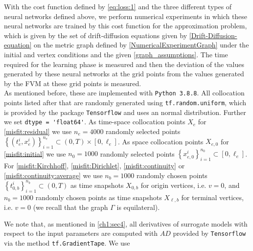 With the cost function defined by \cref{eq:loss:1} and the three different types of neural networks defined above, we perform numerical experiments in which these neural networks are trained by this cost function for the approximation problem, which is given by the set of drift-diffusion equations given by \cref{Drift-Diffusion-equation} on the metric graph defined by \cref{NumericalExperimentGraph} under the initial and vertex conditions and the given \cref{graph_assumptions}. The time required for the learning phase is measured and then the deviation of the values generated by these neural networks at the grid points from the values generated by the FVM at these grid points is measured. \\
As mentioned before, these are implemented with \lstinline!Python 3.8.8!. All collocation points listed after that are randomly generated using \lstinline!tf.random.uniform!, which is provided by the package \lstinline!Tensorflow! and uses an normal distribution. Further we set \lstinline!dtype = 'float64'!. As time-space collocation points $X_e$ for \cref{misfit:residual} we use $n_e = 4000$ randomly selected points $\left\{ \left( t_e^i, x_e^i \right) \right\}_{i=1}^{n_e} \subset \left( 0, T \right) \times [0, \ell_e]$. As space collocation points $X_{e,0}$ for \cref{misfit:initial} we use $n_0 = 1000$ randomly selected points $ \left\{ x_{e,0}^i \right\}_{i=1}^{n_0} \subset [0, \ell_e]$. For \cref{misfit:Kirchhoff}, \cref{misfit:Dirichlet}, \cref{misfit:continuity} or \cref{misfit:continuity:average} we use $n_b = 1000$ randomly chosen points $\left\{ t_{0,b}^i \right\}_{i=1}^{n_b} \subset \left( 0,T \right)$ as time snapshots $X_{0,b}$ for origin vertices, i.e. $v = 0$, and $n_b = 1000$ randomly chosen points as time snapshots $X_{\ell,b}$ for terminal vertices, i.e. $v = 0$ (we recall that the graph $\Gamma$ is equilateral).












We note that, as mentioned in \cref{ch1:sec4}, all derivatives of surrogate models with respect to the input parameters are computed with $AD$ provided by \lstinline!Tensorflow! via the method \lstinline!tf.GradientTape!. We use 


